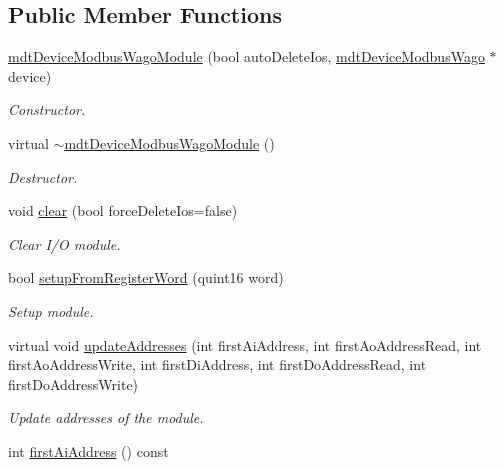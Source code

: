\subsection*{Public Member Functions}
\begin{DoxyCompactItemize}
\item 
\hyperlink{classmdt_device_modbus_wago_module_a888f4d413d3bde075733ddbba4ae7d96}{mdtDeviceModbusWagoModule} (bool autoDeleteIos, \hyperlink{classmdt_device_modbus_wago}{mdtDeviceModbusWago} $\ast$device)
\begin{DoxyCompactList}\small\item\em Constructor. \end{DoxyCompactList}\item 
virtual \hyperlink{classmdt_device_modbus_wago_module_af47e8774515e5960ffb87bc6ec81cea2}{$\sim$mdtDeviceModbusWagoModule} ()
\begin{DoxyCompactList}\small\item\em Destructor. \end{DoxyCompactList}\item 
void \hyperlink{classmdt_device_modbus_wago_module_a7f874ff01aa984101b1d867c781eba67}{clear} (bool forceDeleteIos=false)
\begin{DoxyCompactList}\small\item\em Clear I/O module. \end{DoxyCompactList}\item 
bool \hyperlink{classmdt_device_modbus_wago_module_adf7431cd4d41d7839b42cc21badeabc5}{setupFromRegisterWord} (quint16 word)
\begin{DoxyCompactList}\small\item\em Setup module. \end{DoxyCompactList}\item 
virtual void \hyperlink{classmdt_device_modbus_wago_module_ac7d9da94e7d4c06e288a346ac123c711}{updateAddresses} (int firstAiAddress, int firstAoAddressRead, int firstAoAddressWrite, int firstDiAddress, int firstDoAddressRead, int firstDoAddressWrite)
\begin{DoxyCompactList}\small\item\em Update addresses of the module. \end{DoxyCompactList}\item 
\hypertarget{classmdt_device_modbus_wago_module_a502dc2388ecf0531786c09964b4f7566}{
int \hyperlink{classmdt_device_modbus_wago_module_a502dc2388ecf0531786c09964b4f7566}{firstAiAddress} () const }
\label{classmdt_device_modbus_wago_module_a502dc2388ecf0531786c09964b4f7566}


\end{DoxyCompactItemize}
